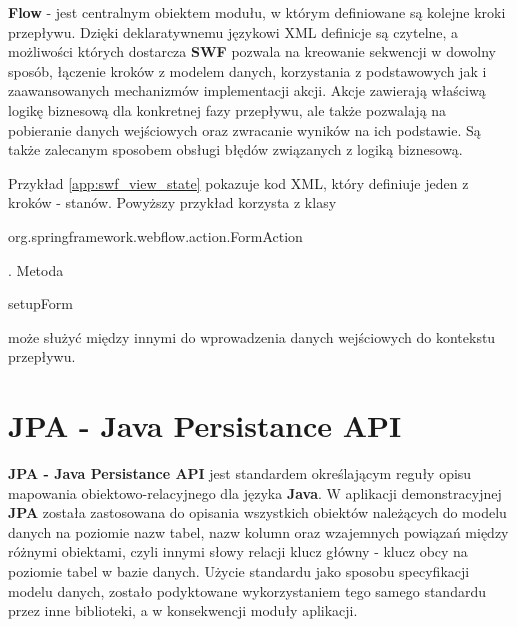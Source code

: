 		\textbf{Flow} \cite{spring_swf_reference} - jest centralnym obiektem modułu, w którym definiowane są kolejne kroki przepływu. Dzięki deklaratywnemu językowi XML definicje są czytelne, a możliwości których dostarcza \textbf{SWF} pozwala na kreowanie sekwencji w dowolny sposób, łączenie kroków z modelem danych, korzystania z podstawowych jak i zaawansowanych mechanizmów implementacji akcji. Akcje zawierają właściwą logikę biznesową dla konkretnej fazy przepływu, ale także pozwalają na pobieranie danych wejściowych oraz zwracanie wyników na ich podstawie. Są także zalecanym sposobem obsługi błędów związanych z logiką biznesową. 
		
		\begin{code}
			\inputminted[
				lineos=true,
				firstline=47,
				lastline=55,
				fontfamily=monospace,
				obeytabs=true,
				samepage=true,
				fontsize=\scriptsize
			]{xml}{../SpringAtom/src/main/webapp/ui/wizard/NewReportWizard/flow.xml}
			\caption[Deklaratywna deklaracja stanu - kroku dla przepływu w rozumieniu \textbf{Spring Web Flow}}
			\label{app:swf_view_state}
		\end{code}
		Przykład \ref{app:swf_view_state} pokazuje kod XML, który definiuje jeden z kroków - stanów. Powyższy przykład korzysta z klasy \begin{code}org.springframework.webflow.action.FormAction\end{code}. Metoda \begin{code}setupForm\end{code} może służyć między innymi do wprowadzenia danych wejściowych do kontekstu przepływu.
	
\section{JPA - Java Persistance API}
\label{tech:jpa}
	\textbf{JPA - Java Persistance API} jest standardem określającym reguły opisu mapowania obiektowo-relacyjnego dla języka \textbf{Java}. W aplikacji demonstracyjnej \textbf{JPA} została zastosowana do opisania wszystkich obiektów należących do modelu danych na poziomie nazw tabel, nazw kolumn oraz wzajemnych powiązań między różnymi obiektami, czyli innymi słowy relacji klucz główny - klucz obcy na poziomie tabel w bazie danych. Użycie standardu jako sposobu specyfikacji modelu danych, zostało podyktowane wykorzystaniem tego samego standardu przez inne biblioteki, a w konsekwencji moduły aplikacji. 
	
